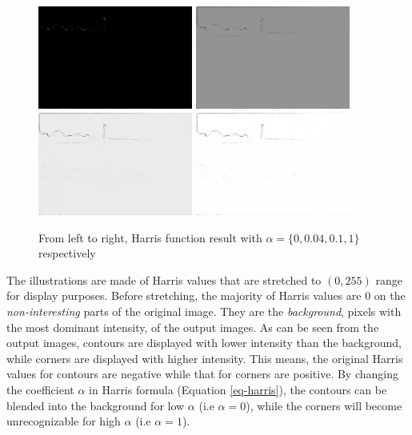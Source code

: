 \documentclass[a4paper, 10pt]{article}
\begin{document}
\begin{figure}[!htb]
\centering
\includegraphics[width=192px]{boat3x3_5_harris_000.png}
\includegraphics[width=192px]{boat3x3_5_harris_004.png}
\includegraphics[width=192px]{boat3x3_5_harris_010.png}
\includegraphics[width=192px]{boat3x3_5_harris_100.png}
\caption{From left to right, Harris function result with $\alpha=\{0, 0.04, 0.1, 1\}$ respectively}
\label{fig-harris}
\end{figure}

The illustrations are made of Harris values that are stretched to $(0, 255)$ range for display purposes. Before stretching, the majority of Harris values are $0$ on the \textit{non-interesting} parts of the original image. They are the \textit{background}, pixels with the most dominant intensity, of the output images. As can be seen from the output images, contours are displayed with lower intensity than the background, while corners are displayed with higher intensity. This means, the original Harris values for contours are negative while that for corners are positive. By changing the coefficient $\alpha$ in Harris formula (Equation \ref{eq-harris}), the contours can be blended into the background for low $\alpha$ (i.e $\alpha=0$), while the corners will become unrecognizable for high $\alpha$ (i.e $\alpha=1$).
\end{document}
